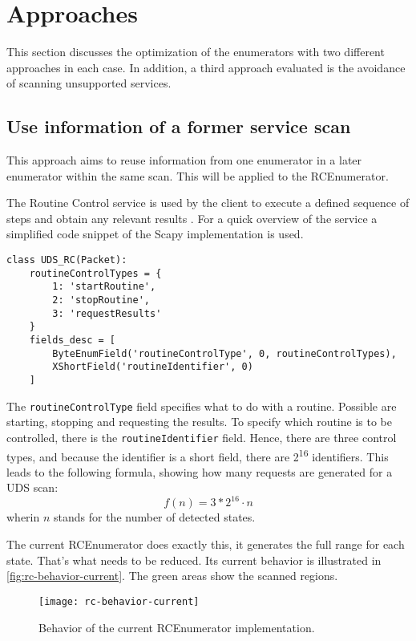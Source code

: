 \section{Approaches}

This section discusses the optimization of the enumerators with two different approaches in each case. In addition, a third approach evaluated is the avoidance of scanning unsupported services. 

\subsection{Use information of a former service scan}

This approach aims to reuse information from one enumerator in a later enumerator within the same scan. This will be applied to the RCEnumerator.

The Routine Control service is used by the client to execute a defined sequence of steps and obtain any relevant results \cite{iso14229}. For a quick overview of the service a simplified code snippet of the Scapy implementation is used.

\begin{samepage}
\begin{verbatim}
class UDS_RC(Packet):
    routineControlTypes = {
        1: 'startRoutine',
        2: 'stopRoutine',
        3: 'requestResults'
    }
    fields_desc = [
        ByteEnumField('routineControlType', 0, routineControlTypes),
        XShortField('routineIdentifier', 0)
    ]
\end{verbatim}
\end{samepage}

The \texttt{routineControlType} field specifies what to do with a routine. Possible are starting, stopping and requesting the results. To specify which routine is to be controlled, there is the \texttt{routineIdentifier} field. Hence, there are three control types, and because the identifier is a short field, there are 2\textsuperscript{16} identifiers. This leads to the following formula, showing how many requests are generated for a UDS scan:
\[f(n)=3 * 2^{16} \cdot n\]
wherin $n$ stands for the number of detected states.

The current RCEnumerator does exactly this, it generates the full range for each state. That's what needs to be reduced. Its current behavior is illustrated in \autoref{fig:rc-behavior-current}. The green areas show the scanned regions.

\begin{figure}[h]
    \centering
    \texttt{[image: rc-behavior-current]}
    \caption{Behavior of the current RCEnumerator implementation.}
    \label{fig:rc-behavior-current}
\end{figure}

